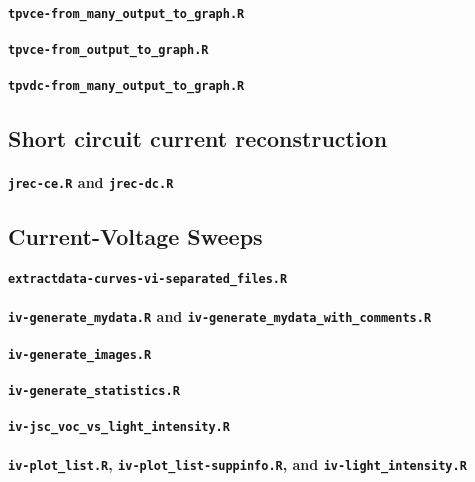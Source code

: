 		\paragraph{\texttt{tpvce-from_many_output_to_graph.R}}
		\paragraph{\texttt{tpvce-from_output_to_graph.R}}
		\paragraph{\texttt{tpvdc-from_many_output_to_graph.R}}


	\subsection{Short circuit current reconstruction}


		\paragraph{\texttt{jrec-ce.R} and \texttt{jrec-dc.R}}

	\subsection{Current-Voltage Sweeps}
		\paragraph{\texttt{extractdata-curves-vi-separated_files.R}}
		\paragraph{\texttt{iv-generate_mydata.R} and \texttt{iv-generate_mydata_with_comments.R}}
		\paragraph{\texttt{iv-generate_images.R}}
		\paragraph{\texttt{iv-generate_statistics.R}}
		\paragraph{\texttt{iv-jsc_voc_vs_light_intensity.R}}
		\paragraph{\texttt{iv-plot_list.R}, \texttt{iv-plot_list-suppinfo.R}, and \texttt{iv-light_intensity.R}}

